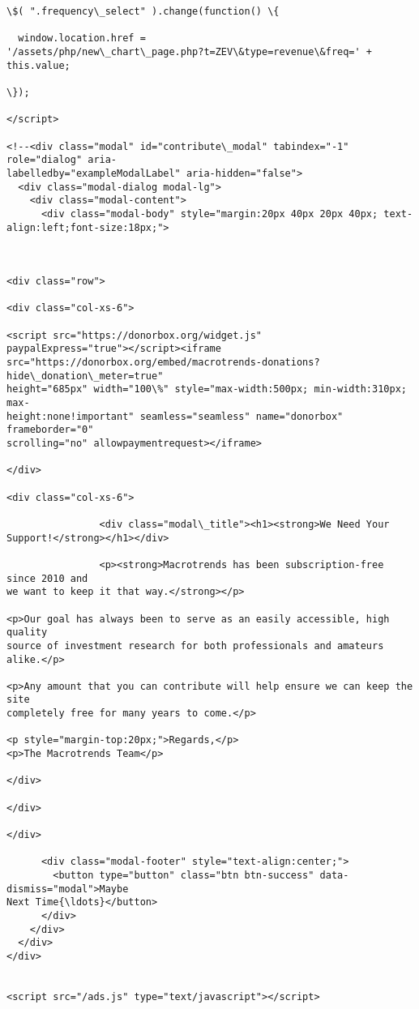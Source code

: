 \documentclass[11pt]{article}
\begin{document}
\begin{Verbatim}[commandchars=\\\{\}]
\$( ".frequency\_select" ).change(function() \{

  window.location.href =
'/assets/php/new\_chart\_page.php?t=ZEV\&type=revenue\&freq=' + this.value;

\});

</script>

<!--<div class="modal" id="contribute\_modal" tabindex="-1" role="dialog" aria-
labelledby="exampleModalLabel" aria-hidden="false">
  <div class="modal-dialog modal-lg">
    <div class="modal-content">
      <div class="modal-body" style="margin:20px 40px 20px 40px; text-
align:left;font-size:18px;">



<div class="row">

<div class="col-xs-6">

<script src="https://donorbox.org/widget.js"
paypalExpress="true"></script><iframe
src="https://donorbox.org/embed/macrotrends-donations?hide\_donation\_meter=true"
height="685px" width="100\%" style="max-width:500px; min-width:310px; max-
height:none!important" seamless="seamless" name="donorbox" frameborder="0"
scrolling="no" allowpaymentrequest></iframe>

</div>

<div class="col-xs-6">

                <div class="modal\_title"><h1><strong>We Need Your
Support!</strong></h1></div>

                <p><strong>Macrotrends has been subscription-free since 2010 and
we want to keep it that way.</strong></p>

<p>Our goal has always been to serve as an easily accessible, high quality
source of investment research for both professionals and amateurs alike.</p>

<p>Any amount that you can contribute will help ensure we can keep the site
completely free for many years to come.</p>

<p style="margin-top:20px;">Regards,</p>
<p>The Macrotrends Team</p>

</div>

</div>

</div>

      <div class="modal-footer" style="text-align:center;">
        <button type="button" class="btn btn-success" data-dismiss="modal">Maybe
Next Time{\ldots}</button>
      </div>
    </div>
  </div>
</div>


<script src="/ads.js" type="text/javascript"></script>


\end{Verbatim}
\end{document}
